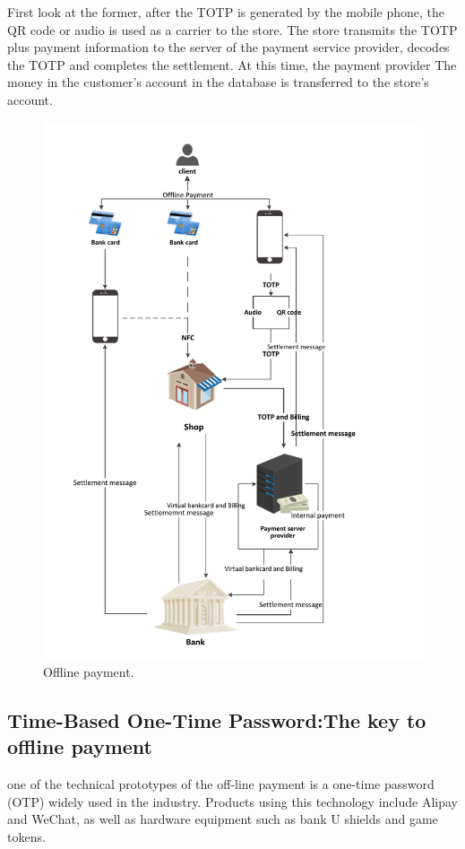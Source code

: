 \documentclass[journal]{IEEEtran}
\begin{document}
First look at the former, after the TOTP is generated by the mobile phone, the QR code or audio is used as a carrier to the store. The store transmits the TOTP plus payment information to the server of the payment service provider, decodes the TOTP and completes the settlement. At this time, the payment provider The money in the customer's account in the database is transferred to the store's account.
\begin{figure}[htbp]
\centerline{\includegraphics[scale=0.68]{offline.pdf}}
\caption{Offline payment.}
\label{fig}
\end{figure}
\subsection{Time-Based One-Time Password:The key to offline payment}
one of the technical prototypes of the off-line payment is a one-time password (OTP) widely used in the industry. Products using this technology include Alipay and WeChat, as well as hardware equipment such as bank U shields and game tokens.
\end{document}
